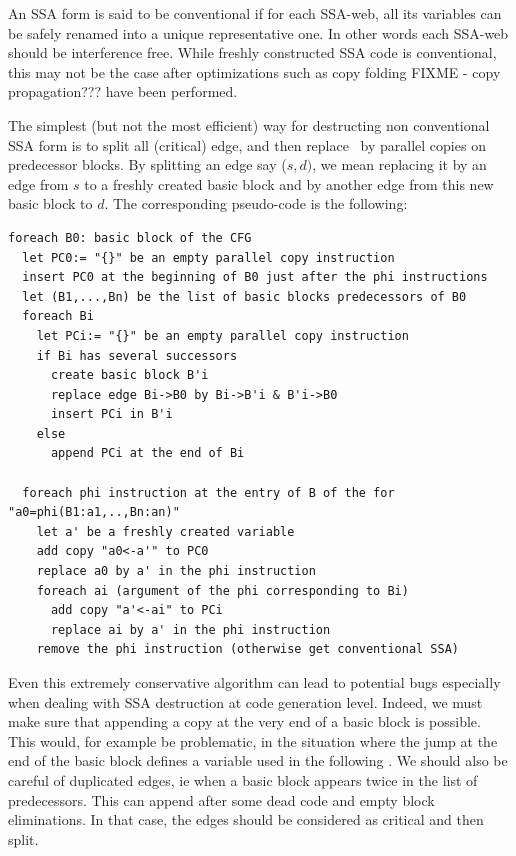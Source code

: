An SSA form is said to be conventional if for each SSA-web, all its variables can be safely renamed into a unique representative one. In other words each SSA-web should be interference free. While freshly constructed SSA code is conventional, this may not be the case after optimizations such as copy folding FIXME - copy propagation???  have been performed.

The simplest (but not the most efficient) way for destructing non conventional SSA form is to split all (critical) edge, and then replace \phiops\ by parallel copies on predecessor blocks. By splitting an edge say ($s,d)$, we mean replacing it by an edge from $s$ to a freshly created basic block and by another edge from this new basic block to $d$. The corresponding pseudo-code is the following:

\begin{verbatim}
foreach B0: basic block of the CFG
  let PC0:= "{}" be an empty parallel copy instruction
  insert PC0 at the beginning of B0 just after the phi instructions
  let (B1,...,Bn) be the list of basic blocks predecessors of B0
  foreach Bi
    let PCi:= "{}" be an empty parallel copy instruction
    if Bi has several successors
      create basic block B'i
      replace edge Bi->B0 by Bi->B'i & B'i->B0
      insert PCi in B'i
    else
      append PCi at the end of Bi
    
  foreach phi instruction at the entry of B of the for "a0=phi(B1:a1,..,Bn:an)"
    let a' be a freshly created variable
    add copy "a0<-a'" to PC0
    replace a0 by a' in the phi instruction
    foreach ai (argument of the phi corresponding to Bi)
      add copy "a'<-ai" to PCi
      replace ai by a' in the phi instruction
    remove the phi instruction (otherwise get conventional SSA)
\end{verbatim}


Even this extremely conservative algorithm can lead to potential bugs especially when dealing with SSA destruction at code generation level. Indeed, we must make sure that appending a copy at the very end of a basic block is possible. This would, for example be problematic, in the situation where the jump at the end of the basic block defines a variable used in the following \phiop. We should also be careful of duplicated edges, ie when a basic block appears twice in the list of predecessors. This can append after some dead code and empty block eliminations. In that case, the edges should be considered as critical and then split.

